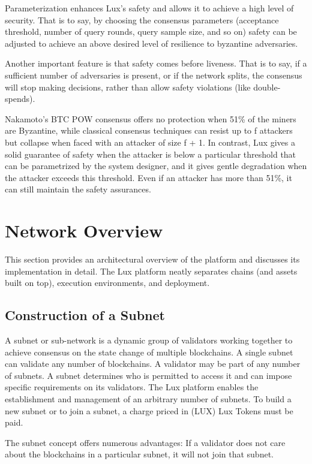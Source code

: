 \documentclass[11pt]{article}
\begin{document}
Parameterization enhances Lux's safety and allows it to achieve a high level of security. That is to say, by choosing the consensus parameters (acceptance threshold, number of query rounds, query sample size, and so on) safety can be adjusted to achieve an above desired level of resilience to byzantine adversaries.


Another important feature is that safety comes before liveness. That is to say, if a sufficient number of adversaries is present, or if the network splits, the consensus will stop making decisions, rather than allow safety violations (like double-spends).


Nakamoto's BTC POW consensus offers no protection when 51\% of the miners are Byzantine, while classical consensus techniques can resist up to f attackers but collapse when faced with an attacker of size f + 1. In contrast, Lux gives a solid guarantee of safety when the attacker is below a particular threshold that can be parametrized by the system designer, and it gives gentle degradation when the attacker exceeds this threshold. Even if an attacker has more than 51\%, it can still maintain the safety assurances.


\section{Network Overview}

This section provides an architectural overview of the platform and discusses its implementation in detail. The Lux platform neatly separates chains (and assets built on top), execution environments, and deployment.


\subsection{Construction of a Subnet}

A subnet or sub-network is a dynamic group of validators working together to achieve consensus on the state change of multiple blockchains. A single subnet can validate any number of blockchains. A validator may be part of any number of subnets. A subnet determines who is permitted to access it and can impose specific requirements on its validators. The Lux platform enables the establishment and management of an arbitrary number of subnets. To build a new subnet or to join a subnet, a charge priced in (LUX) Lux Tokens must be paid.


The subnet concept offers numerous advantages: If a validator does not care about the blockchains in a particular subnet, it will not join that subnet.
\end{document}
